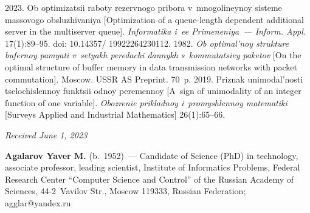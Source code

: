 \begin{multicols}{2}
{{\begin{thebibliography}{99}
 2023. Ob op\-ti\-mi\-za\-tsii ra\-bo\-ty re\-zerv\-no\-go pri\-bo\-ra  
v~mno\-go\-li\-ney\-noy sis\-te\-me mas\-so\-vo\-go ob\-slu\-zhi\-va\-niya [Optimization of a queue-length 
dependent additional server in the multiserver queue]. \textit{Informatika i~ee Primeneniya~--- Inform. 
Appl.} 17(1):89--95. doi: 10.14357/ 19922264230112.
 1982. \textit{Ob op\-ti\-mal'\-noy struk\-tu\-re bu\-fer\-noy 
pa\-mya\-ti v~se\-tyakh pe\-re\-da\-chi dan\-nykh s~kom\-mu\-ta\-tsiey pa\-ke\-tov} [On the optimal structure 
of buffer memory in data transmission networks with packet commutation]. Moscow. USSR AS Preprint. 70~p.
 2019. Pri\-znak uni\-mo\-dal'\-nosti tse\-lo\-chis\-len\-noy funk\-tsii  
od\-noy pe\-re\-men\-noy [A~sign of unimodality of an integer function of one variable]. \textit{Obozrenie 
pri\-klad\-noy i~pro\-mysh\-len\-noy ma\-te\-ma\-ti\-ki} [Surveys Applied and Industrial Mathematics] 
26(1):65--66.

\end{thebibliography}

 }
 }

\end{multicols}

\vspace*{-6pt}

\hfill{\small\textit{Received June 1, 2023}} 

\vspace*{-12pt}


\Contrl

\noindent
\textbf{Agalarov Yaver M.} (b.\ 1952)~--- Candidate of Science (PhD) in technology, associate professor, 
leading scientist, Institute of Informatics Problems, Federal Research Center ``Computer Science and 
Control'' of the Russian Academy of Sciences, 44-2~Vavilov Str., Moscow 119333, Russian Federation; 
\mbox{agglar@yandex.ru}
  




\label{end\stat}

\renewcommand{\bibname}{\protect\rm Литература} 